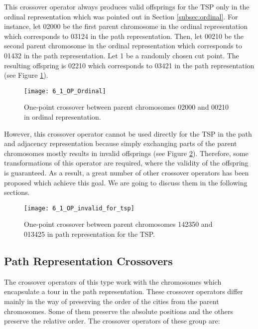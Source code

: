 This crossover operator always produces valid offsprings for the TSP only in the ordinal representation which was pointed out in Section \ref{subsec:ordinal}. For instance, let 02000 be the first parent chromosome in the ordinal representation which corresponds to 03124 in the path representation. Then, let 00210 be the second parent chromosome in the ordinal representation which corresponds to 01432 in the path representation. Let 1 be a randomly chosen cut point. The resulting offspring is 02210 which corresponds to 03421 in the path representation (see Figure \ref{fig:6_1_OP_Ordinal}). \par 
 
 \begin{figure}[htp] \centering
 	\centering
 	\texttt{[image: 6\_1\_OP\_Ordinal]}
 	\caption{One-point crossover between parent chromosomes 02000 and 00210 in ordinal representation.}
 	\label{fig:6_1_OP_Ordinal}
 \end{figure}
 
However, this crossover operator cannot be used directly for the TSP in the path and adjacency representation because simply exchanging parts of the parent chromosomes mostly results in invalid offsprings (see Figure \ref{fig:6_1_OP_invalid_for_tsp}). Therefore, some transformations of this operator are required, where the validity of the offspring is guaranteed. As a result, a great number of other crossover operators has been proposed which achieve this goal. We are going to discuss them in the following sections. \par 

\begin{figure}[htp] \centering
	\centering
	\texttt{[image: 6\_1\_OP\_invalid\_for\_tsp]}
	\caption{One-point crossover between parent chromosomes 142350 and 013425 in path representation for the TSP.}
	\label{fig:6_1_OP_invalid_for_tsp}
\end{figure}

\subsection{Path Representation Crossovers}
\label{subsec:path_crossovers}

The crossover operators of this type work with the chromosomes which encapsulate a tour in the path representation. These crossover operators differ mainly in the way of preserving the order of the cities from the parent chromosomes. Some of them preserve the absolute positions and the others preserve the relative order. The crossover operators of these group are:

